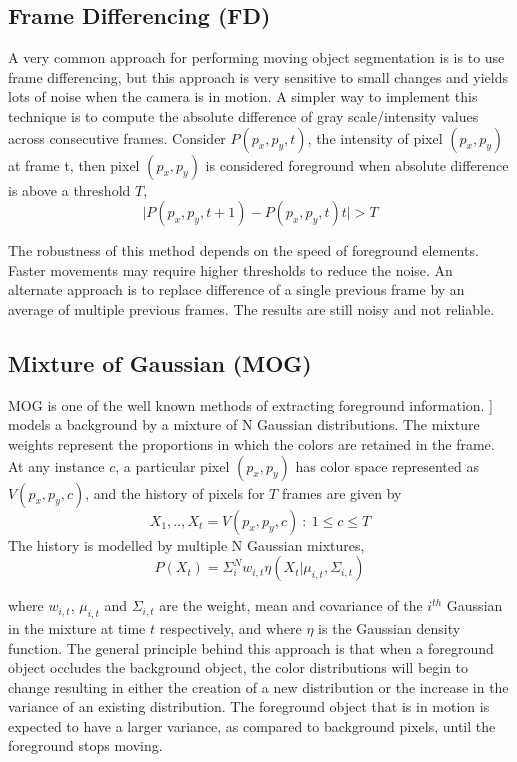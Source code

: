 \subsection{Frame Differencing (FD)}
A very common approach for performing moving object segmentation is is to use frame differencing, but this approach is very sensitive to small changes and yields lots of noise when the camera is in motion.  A simpler way to implement this technique is to compute the absolute difference of gray scale/intensity values across consecutive frames. Consider $P(p_x,p_y,t)$, the intensity of pixel $(p_x,p_y)$ at frame t, then pixel $(p_x,p_y)$ is considered foreground when absolute difference is above a threshold $T$,$$\vert P(p_x,p_y,t+1) - P(p_x,p_y,t)t\vert > T$$
\par The robustness of this method depends on the speed of foreground elements.  Faster movements may require higher thresholds to reduce the noise.   An alternate approach is to replace difference of a single previous frame  by an average of multiple previous frames. The results are still noisy and not reliable.

\subsection{Mixture of Gaussian (MOG)}
MOG is one of the well known methods of extracting foreground information.  \cite{kaew}] models a background by a mixture of N Gaussian distributions.  The mixture weights represent the proportions in which the colors are retained in the frame.  At any instance $c$, a particular pixel $(p_x,p_y)$ has color space represented as $V(p_{x},p_{y},c)$, and the history of pixels for $T$ frames are given by 
$$X_{1},..,X_{t} = {V(p_{x},p_{y},c)~:~1\le c \le T }$$
The history is modelled by multiple N Gaussian mixtures,
$$P(X_{t})=\Sigma_{i}^{N}w_{i,t}\eta(X_{t}|\mu_{i,t},\Sigma_{i,t})$$
\par where $w_{i,t}$, $\mu_{i,t}$ and $\Sigma_{i,t}$ are the weight, mean and covariance of the $i^{th}$ Gaussian in the mixture at time $t$ respectively, and where $\eta$ is the Gaussian density function.  The general principle behind this approach is that when a foreground object occludes the background object, the color distributions will begin to change resulting in either the creation of a new distribution or the increase in the variance of an existing distribution.  The foreground object that is in motion is expected to have a larger variance, as compared to background pixels, until the foreground stops moving.


